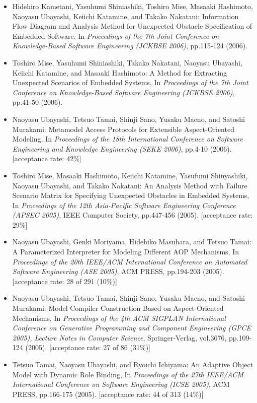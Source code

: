 \documentclass{jarticle}
\begin{document}
\begin{itemize}
\item Hidehiro Kametani, Yasuhumi Shiniashiki, Toshiro Mise, Masaaki Hashimoto, Naoyasu Ubayashi, Keiichi Katamine, and Takako Nakatani:
Information Flow Diagram and Analysis Method for Unexpected Obstacle Specification of Embedded Software,
In {\em Proceedings of the 7th Joint Conference on Knowledge-Based Software Engineering (JCKBSE 2006)},
pp.115-124 (2006).

\item Toshiro Mise, Yasuhumi Shiniashiki, Takako Nakatani, Naoyasu Ubayashi, Keiichi Katamine, and Masaaki Hashimoto:
A Method for Extracting Unexpected Scenarios of Embedded Systems,
In {\em Proceedings of the 7th Joint Conference on Knowledge-Based Software Engineering (JCKBSE 2006)},
pp.41-50 (2006).

\item Naoyasu Ubayashi, Tetsuo Tamai, Shinji Sano, Yusaku Maeno, and Satoshi Murakami:
Metamodel Access Protocols for Extensible Aspect-Oriented Modeling,
In {\em Proceedings of the 18th International Conference on Software Engineering and Knowledge Engineering (SEKE 2006)},
pp.4-10 (2006).
[acceptance rate: 42\%]

\item Toshiro Mise, Masaaki Hashimoto, Keiichi Katamine, Yasufumi Shinyashiki, Naoyasu Ubayashi, and Takako Nakatani:
An Analysis Method with Failure Scenario Matrix for Specifying Unexpected Obstacles in Embedded Systems,
In {\em Proceedings of the 12th Asia-Pacific Software Engineering Conference (APSEC 2005)},
IEEE Computer Society,
pp.447-456 (2005).
[acceptance rate: 29\%]

\item Naoyasu Ubayashi, Genki Moriyama, Hidehiko Masuhara, and Tetsuo Tamai:
A Parameterized Interpreter for Modeling Different AOP Mechanisms,
In {\em Proceedings of the 20th IEEE/ACM International Conference on Automated Software Engineering (ASE 2005)},
ACM PRESS,
pp.194-203 (2005).
[acceptance rate: 28 of 291 (10\%)]

\item Naoyasu Ubayashi, Tetsuo Tamai, Shinji Sano, Yusaku Maeno, and Satoshi Murakami:
Model Compiler Construction Based on Aspect-Oriented Mechanisms,
In {\em Proceedings of the 4th ACM SIGPLAN International Conference on Generative Programming and Component Engineering (GPCE 2005),
Lecture Notes in Computer Science}, Springer-Verlag, vol.3676,
pp.109-124 (2005).
[acceptance rate: 27 of 86 (31\%)]

\item Tetsuo Tamai, Naoyasu Ubayashi, and Ryoichi Ichiyama:
An Adaptive Object Model with Dynamic Role Binding,
In {\em Proceedings of the 27th IEEE/ACM International Conference on Software Engineering (ICSE 2005)},
ACM PRESS,
pp.166-175 (2005).
[acceptance rate: 44 of 313 (14\%)]


\end{itemize}
\end{document}
